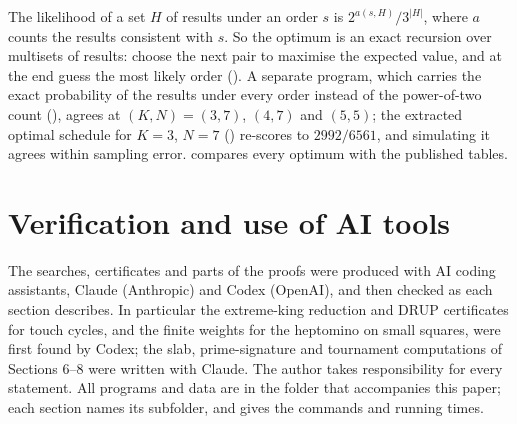 \documentclass[11pt]{amsart}
\theoremstyle{remark}
\begin{document}
\noindent The likelihood of a set $H$ of results under an order $s$ is $2^{a(s,H)}/3^{|H|}$, where $a$
counts the results consistent with $s$. So the optimum is an exact recursion over multisets of
results: choose the next pair to maximise the expected value, and at the end guess the most likely
order (). A separate program, which carries the exact
probability of the results under every order instead of the power-of-two count
(), agrees at $(K,N)=(3,7)$, $(4,7)$ and
$(5,5)$; the extracted optimal schedule for $K=3$, $N=7$ () re-scores
to $2992/6561$, and simulating it agrees within sampling error.  compares
every optimum with the published tables.

\section*{Verification and use of AI tools}

The searches, certificates and parts of the proofs were produced with AI coding assistants, Claude
(Anthropic) and Codex (OpenAI), and then checked as each section describes. In particular the
extreme-king reduction and DRUP certificates for touch cycles, and the finite weights for the
heptomino on small squares, were first found by Codex; the slab, prime-signature and tournament
computations of Sections 6--8 were written with Claude. The author takes responsibility for every
statement. All programs and data are in the folder that accompanies this paper; each section names
its subfolder, and  gives the commands and running times.
\end{document}
